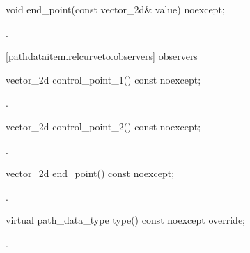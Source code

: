 \begin{itemdecl}
    void end_point(const vector_2d& value) noexcept;
\end{itemdecl}
\begin{itemdescr}
	\pnum
	\postconditions
	.
	
\end{itemdescr}

 [pathdataitem.relcurveto.observers]{ observers}

\begin{itemdecl}
    vector_2d control_point_1() const noexcept;
\end{itemdecl}
\begin{itemdescr}
	\pnum
	\returns
	.

\end{itemdescr}

\begin{itemdecl}
    vector_2d control_point_2() const noexcept;
\end{itemdecl}
\begin{itemdescr}
	\pnum
	\returns
	.

\end{itemdescr}

\begin{itemdecl}
    vector_2d end_point() const noexcept;
\end{itemdecl}
\begin{itemdescr}
	\pnum
	\returns
	.

\end{itemdescr}

\begin{itemdecl}
    virtual path_data_type type() const noexcept override;
\end{itemdecl}
\begin{itemdescr}
	\pnum
	\returns
	.

\end{itemdescr}
